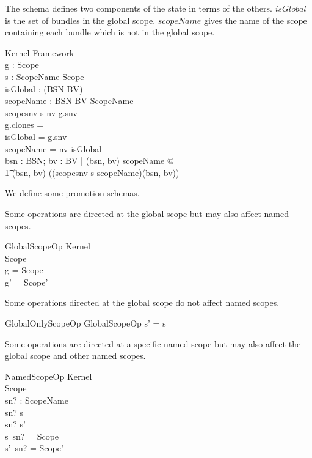 \documentclass[a4paper,12pt]{article}
\begin{document}
The schema defines two components of the state in terms of the others.
$isGlobal$  is the set of bundles in the global scope.
$scopeName$ gives the name of the scope containing each bundle which is not in the global scope.
\begin{schema}{Kernel}
Framework \\
g : Scope \\
s : ScopeName \pinj Scope \\
isGlobal : \power (BSN \cross BV) \\
scopeName : BSN \cross BV \pfun ScopeName \\
\where
scopesnv \circ s \partition nv \setminus g.snv \\ 
g.clones = \emptyset \\
isGlobal = \dom g.snv \\
\dom scopeName = \dom nv \setminus isGlobal \\
\forall bsn : BSN; bv : BV | (bsn, bv) \in \dom scopeName @ \\
\t1 (bsn, bv) \in \dom ((scopesnv \circ s \circ scopeName)(bsn, bv)) \\
\end{schema}

We define some promotion schemas.

Some operations are directed at the global scope but may also affect named scopes.
\begin{schema}{GlobalScopeOp}
\Delta Kernel \\
\Delta Scope \\
\where
g = \theta Scope \\
g' = \theta Scope' \\
\end{schema}

Some operations directed at the global scope do not affect named scopes.
\begin{schema}{GlobalOnlyScopeOp}
GlobalScopeOp
\where
s' = s \\
\end{schema}

Some operations are directed at a specific named scope but may also affect the global scope
and other named scopes.
\begin{schema}{NamedScopeOp}
\Delta Kernel \\
\Delta Scope \\
sn? : ScopeName \\
\where
sn? \in \dom s \\
sn? \in \dom s' \\
s~sn? = \theta Scope \\
s'~sn? = \theta Scope' \\
\end{schema}
\end{document}
